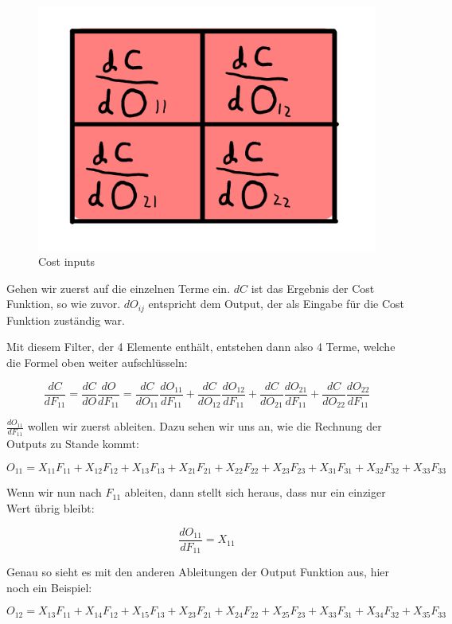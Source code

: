 \documentclass[12pt]{article}
\begin{document}
\begin{figure}[H]
\centering
\includegraphics[scale=0.30]{./Images/012_Cost_Deltas.png}
\caption{Cost inputs}
\label{Cost inputs}
\end{figure}

Gehen wir zuerst auf die einzelnen Terme ein. $dC$ ist das Ergebnis der Cost Funktion, so wie zuvor. $dO_{ij}$ entspricht dem Output, der als Eingabe für die Cost Funktion zuständig war.

Mit diesem Filter, der 4 Elemente enthält, entstehen dann also 4 Terme, welche die Formel oben weiter aufschlüsseln:

$$
\frac{dC}{dF_{11}} = 
\frac{dC} {dO} \frac{dO} {dF_{11}}= 
\frac{dC} {dO_{11}} \frac{dO_{11}} {dF_{11}}+
\frac{dC} {dO_{12}} \frac{dO_{12}} {dF_{11}}+
\frac{dC} {dO_{21}} \frac{dO_{21}} {dF_{11}}+
\frac{dC} {dO_{22}} \frac{dO_{22}} {dF_{11}}
$$

$\frac{dO_{11}} {dF_{11}}$ wollen wir zuerst ableiten. Dazu sehen wir uns an, wie die Rechnung der Outputs zu Stande kommt:

$$
O_{11} = X_{11}F_{11}+X_{12}F_{12}+X_{13}F_{13}+X_{21}F_{21}+X_{22}F_{22}+X_{23}F_{23}+X_{31}F_{31}+X_{32}F_{32}+X_{33}F_{33}
$$

Wenn wir nun nach $F_{11}$ ableiten, dann stellt sich heraus, dass nur ein einziger Wert übrig bleibt:

$$\frac{dO_{11}} {dF_{11}} = X_{11}$$

Genau so sieht es mit den anderen Ableitungen der Output Funktion aus, hier noch ein Beispiel:

$$
O_{12} = X_{13}F_{11}+X_{14}F_{12}+X_{15}F_{13}+X_{23}F_{21}+X_{24}F_{22}+X_{25}F_{23}+X_{33}F_{31}+X_{34}F_{32}+X_{35}F_{33}
$$
\end{document}
